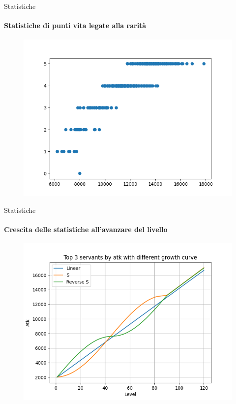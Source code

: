 \documentclass{beamer}
\begin{document}
\begin{darkframes}
  \begin{frame}{Statistiche}
    \framesubtitle{Statistiche di punti vita legate alla rarità}
    \begin{figure}
      \centering
      \includegraphics[scale=0.55]{./images/class_and_stats_hp.png}
    \end{figure}
  \end{frame}

  \begin{frame}{Statistiche}
    \framesubtitle{Crescita delle statistiche all'avanzare del livello}
    \begin{figure}
      \centering
      \includegraphics[scale=0.55]{./images/growth.png}
    \end{figure}
  \end{frame}


\end{darkframes}
\end{document}
